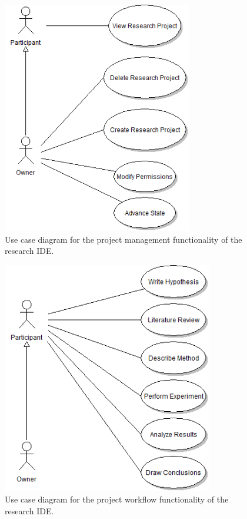 \documentclass[document.tex]{subfiles}
\begin{document}
\begin{figure}[!ht]
\centering \includegraphics[height=4in]{./img/case-study-research-railgun/project_management_use_case}
\caption{Use case diagram for the project management functionality of the research IDE.}
\label{fig:case-research-use-case-project-management}
\end{figure}

\begin{figure}[!ht]
\centering \includegraphics[height=4in]{./img/case-study-research-railgun/project_workflow_use_case}
\caption{Use case diagram for the project workflow functionality of the research IDE.}
\label{fig:case-research-use-case-project-workflow}
\end{figure}
\end{document}
